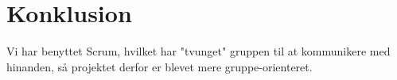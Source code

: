 \section{Konklusion}
Vi har benyttet Scrum, hvilket har "tvunget" gruppen til at kommunikere med hinanden, så projektet derfor er blevet mere gruppe-orienteret.